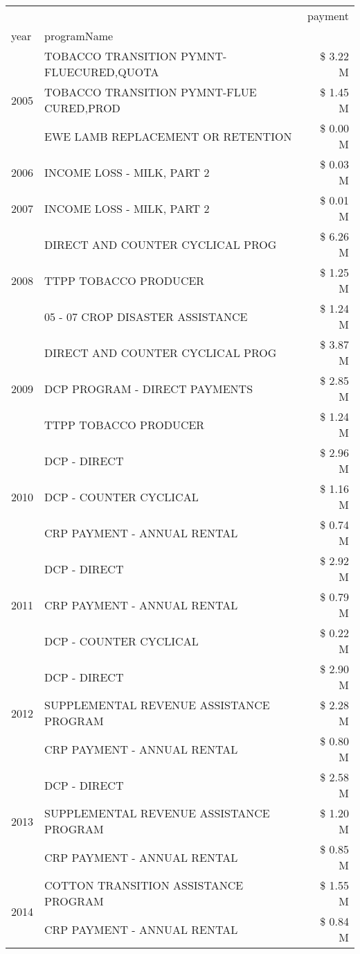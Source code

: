 \begin{tabular}{llr}
\toprule
 &  & payment \\
year & programName &  \\
\midrule
\multirow[t]{3}{*}{2005} & TOBACCO TRANSITION PYMNT-FLUECURED,QUOTA & \$ 3.22 M \\
 & TOBACCO TRANSITION PYMNT-FLUE CURED,PROD & \$ 1.45 M \\
 & EWE LAMB REPLACEMENT OR RETENTION & \$ 0.00 M \\
\cline{1-3}
2006 & INCOME LOSS - MILK, PART 2 & \$ 0.03 M \\
\cline{1-3}
2007 & INCOME LOSS - MILK, PART 2 & \$ 0.01 M \\
\cline{1-3}
\multirow[t]{3}{*}{2008} & DIRECT AND COUNTER CYCLICAL PROG & \$ 6.26 M \\
 & TTPP TOBACCO PRODUCER & \$ 1.25 M \\
 & 05 - 07 CROP DISASTER ASSISTANCE & \$ 1.24 M \\
\cline{1-3}
\multirow[t]{3}{*}{2009} & DIRECT AND COUNTER CYCLICAL PROG & \$ 3.87 M \\
 & DCP PROGRAM - DIRECT PAYMENTS & \$ 2.85 M \\
 & TTPP TOBACCO PRODUCER & \$ 1.24 M \\
\cline{1-3}
\multirow[t]{3}{*}{2010} & DCP - DIRECT & \$ 2.96 M \\
 & DCP - COUNTER CYCLICAL & \$ 1.16 M \\
 & CRP PAYMENT - ANNUAL RENTAL & \$ 0.74 M \\
\cline{1-3}
\multirow[t]{3}{*}{2011} & DCP - DIRECT & \$ 2.92 M \\
 & CRP PAYMENT - ANNUAL RENTAL & \$ 0.79 M \\
 & DCP - COUNTER CYCLICAL & \$ 0.22 M \\
\cline{1-3}
\multirow[t]{3}{*}{2012} & DCP - DIRECT & \$ 2.90 M \\
 & SUPPLEMENTAL REVENUE ASSISTANCE PROGRAM & \$ 2.28 M \\
 & CRP PAYMENT - ANNUAL RENTAL & \$ 0.80 M \\
\cline{1-3}
\multirow[t]{3}{*}{2013} & DCP - DIRECT & \$ 2.58 M \\
 & SUPPLEMENTAL REVENUE ASSISTANCE PROGRAM & \$ 1.20 M \\
 & CRP PAYMENT - ANNUAL RENTAL & \$ 0.85 M \\
\cline{1-3}
\multirow[t]{3}{*}{2014} & COTTON TRANSITION ASSISTANCE PROGRAM & \$ 1.55 M \\
 & CRP PAYMENT - ANNUAL RENTAL & \$ 0.84 M \\

\end{tabular}
